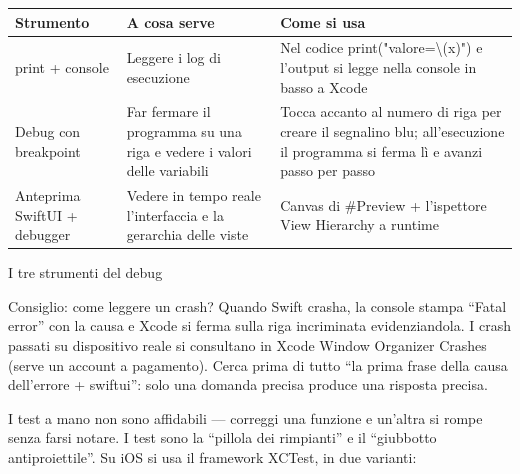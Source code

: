 


\begin{center}
\begin{tabularx}{\linewidth}{|X|X|X|}
\hline
\textbf{Strumento} & \textbf{A cosa serve} & \textbf{Come si usa} \tabularnewline
\hline
print + console & Leggere i log di esecuzione & Nel codice print("valore=\textbackslash{}(x)") e l'output si legge nella console in basso a Xcode \tabularnewline
Debug con breakpoint & Far fermare il programma su una riga e vedere i valori delle variabili & Tocca accanto al numero di riga per creare il segnalino blu; all'esecuzione il programma si ferma lì e avanzi passo per passo \tabularnewline
Anteprima SwiftUI + debugger & Vedere in tempo reale l'interfaccia e la gerarchia delle viste & Canvas di \#Preview + l'ispettore View Hierarchy a runtime \tabularnewline
\hline
\end{tabularx}
\end{center}

\begin{center}\small\color{gray}I tre strumenti del debug\end{center}

\begin{tcbinfo}{Consiglio: come leggere un crash?}
Quando Swift crasha, la console stampa “Fatal error” con la causa e Xcode si ferma sulla riga incriminata evidenziandola. I crash passati su dispositivo reale si consultano in Xcode Window Organizer Crashes (serve un account a pagamento). Cerca prima di tutto “la prima frase della causa dell'errore + swiftui”: solo una domanda precisa produce una risposta precisa.

\end{tcbinfo}


I test a mano non sono affidabili — correggi una funzione e un'altra si rompe senza farsi notare. I test sono la “pillola dei rimpianti” e il “giubbotto antiproiettile”. Su iOS si usa il framework XCTest, in due varianti:

